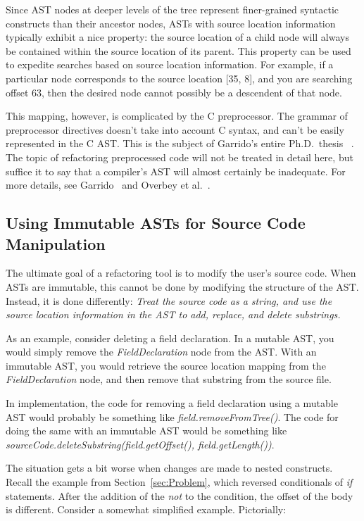 \documentclass[prodmode]{acmlarge}
\begin{document}
Since AST nodes at deeper levels of the tree represent finer-grained syntactic
constructs than their ancestor nodes, ASTs with source location information
typically exhibit a nice property: the source location of a child node will
always be contained within the source location of its parent.  This property
can be used to expedite searches based on source location information.  For
example, if a particular node corresponds to the source location [35, 8], and
you are searching offset 63, then the desired node cannot possibly be a
descendent of that node.

This mapping, however, is complicated by the C preprocessor. The grammar of 
preprocessor directives doesn't take into account C syntax, and can't be easily
represented in the C AST. This is the subject of Garrido's entire Ph.D.~thesis~%
\cite{garrido05program}. The topic of refactoring preprocessed code will not be treated in detail here,
but suffice it to say that a compiler's AST will almost certainly be inadequate.
For more details, see Garrido~\cite{garrido2013} and Overbey et al.~\cite{wrt2009}.




\subsection{Using Immutable ASTs for Source Code Manipulation}
\label{ss:manip}

The ultimate goal of a refactoring tool is to modify the user's source code.
When ASTs are immutable, this cannot be done by modifying the structure of the
AST.  Instead, it is done differently: \textit{Treat the source code as a
string, and use the source location information in the AST to add, replace, and
delete substrings.}

As an example, consider deleting a field declaration.  In a mutable AST, you
would simply remove the \textit{FieldDeclaration} node from the AST.  With an
immutable AST, you would retrieve the source location mapping from the
\textit{FieldDeclaration} node, and then remove that substring from the source
file.

In implementation, the code for removing a field declaration using a mutable
AST would probably be something like \textit{field.removeFromTree()}.  The code
for doing the same with an immutable AST would be something like
\textit{sourceCode.deleteSubstring(field.getOffset(), field.getLength())}.

The situation gets a bit worse when changes are made to nested constructs.
Recall the example from Section~\ref{sec:Problem}, which reversed conditionals 
of \textit{if} statements. After the addition of the \textit{not} to the 
condition, the offset of the body is different. Consider a somewhat simplified 
example. Pictorially:
\end{document}

